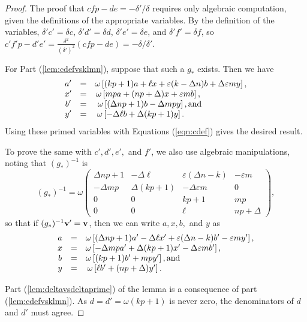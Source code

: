 \documentclass{amsart}     %
\theoremstyle{definition}
\begin{document}
\begin{proof}
The proof that $cfp - de = - \delta' /\delta$ requires only algebraic computation, given the definitions of the appropriate variables. By the definition of the variables, $\delta'  c'  = \delta c$,  $\delta'  d'  = \delta d$,  $\delta'  e' = \delta e$,  and $\delta' f'  = \delta f$, so  $c'  f' p -  d'  e'  = \frac{\delta ^2}{(\delta')^2}(cfp - de) = - \delta/\delta'$.

For Part (\ref{lem:cdefvsklmn}), suppose that such a $g_*$ exists. Then we have
\[\begin{matrix} a' & = &  \omega \left[ (kp + 1) a + \ell x + \varepsilon (k - \Delta n) b + \Delta \varepsilon m y\right], \\
x' & = &  \omega \left[ mpa + (np +\Delta) x +  \varepsilon m b\right], \hspace{.75in}\\
b' &=& \omega \left[  (\Delta np + 1)b - \Delta m p y\right], \mbox{and} \hspace{.7in}\\
y' &=&   \omega \left[ -\Delta \ell b + \Delta(kp + 1) y\right].\hspace{1.0in}
\end{matrix}\]
%
Using these primed variables with Equations (\ref{eqn:cdef}) gives the desired result.

To prove the same with $c', d', e',$ and $f'$, we also use algebraic manipulations, noting that  $(g_*)^{-1}$ is 
\[(g_*)^{-1} = \omega\begin{pmatrix}  \Delta np+1 & - \Delta \ell & \varepsilon ( \Delta n - k) &  - \varepsilon m \\
- \Delta mp & \Delta (kp + 1) & - \Delta \varepsilon m & 0 \\ 0 & 0 &kp + 1 & mp \\ 
0 & 0 &  \ell & np + \Delta \end{pmatrix},\]
%
so that if $(g_*)^{-1} \textbf v' = \textbf v$, then we can write $a, x, b,$ and $y$ as 
\[\begin{matrix} a & = &  \omega \left[ (\Delta np+1 )a' - \Delta \ell x' + \varepsilon ( \Delta n - k) b'   - \varepsilon m y' \right],\\
x & = & \omega \left[  - \Delta mp a' + \Delta (kp + 1) x' - \Delta \varepsilon mb' \right], \hspace{.55in}\\
b &=&  \omega \left[ (kp + 1)b' + m p y'\right], \mbox{and} \hspace{1.22in}\\
y &=&   \omega \left[ \ell b' + (np + \Delta) y'\right]. \hspace{1.5in}
\end{matrix}\]


Part (\ref{lem:deltavsdeltaprime}) of the lemma is a consequence of part (\ref{lem:cdefvsklmn}). As $d = d' = \omega(kp + 1)$ is never zero, the denominators of $d$ and $d'$ must agree.
\end{proof}
\end{document}
